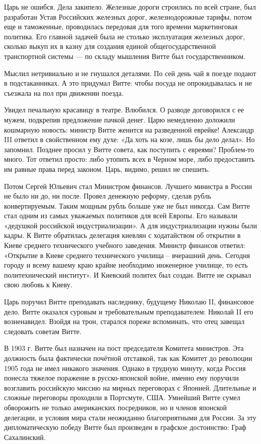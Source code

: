 Царь не ошибся. Дела закипело. Железные дороги строились по всей стране, был
разработан Устав Российских железных дорог, железнодорожные тарифы, потом еще и
таможенные, проводилась передовая для того времени маркетинговая политика. Его
главной задачей была не столько эксплуатация железных дорог, сколько выкуп их в
казну для создания единой общегосударственной транспортной системы — по складу
мышления Витте был государственником.

Мыслил нетривиально и не гнушался деталями. По сей день чай в поезде подают в
подстаканниках. А это придумал Витте: чтобы посуда не опрокидывалась и не
съезжала на пол при движении поезда. 

Увидел печальную красавицу в театре. Влюбился. О разводе договорился с ее
мужем, подкрепив предложение пачкой денег. Царю немедленно доложили кошмарную
новость: министр Витте женится на разведенной еврейке! Александр III ответил в
свойственном ему духе: «Да хоть на козе, лишь бы дело делал». Но запомнил.
Позднее просил у Витте совета, как поступить с евреями? Проблем-то много. Тот
ответил просто: либо утопить всех в Черном море, либо предоставить им равные
права перед законом. Царь, видимо, решил не спешить. 

Потом Сергей Юльевич стал Министром финансов. Лучшего министра в России не было
ни до, ни после. Провел денежную реформу, сделав рубль конвертируемым. Таким
мощным рубль больше уже не был никогда. Сам Витте стал одним из самых уважаемых
политиков для всей Европы. Его называли «дедушкой российской индустриализации».
А для индустриализации нужны были кадры. К Витте обратилась делегация киевлян с
ходатайством об открытии в Киеве среднего технического учебного заведения.
Министр финансов ответил: «Открытие в Киеве среднего технического училища –
вчерашний день. Сегодня городу и всему вашему краю крайне необходимо инженерное
училище, то есть политехнический институт». И Киевский политех был создан.
Витте не скрывал свою любовь к Киеву.

Царь поручил Витте преподавать наследнику, будущему Николаю II, финансовое
дело. Витте оказался суровым и требовательным преподавателем: Николай II его
возненавидел. Взойдя на трон, старался пореже вспоминать, что отец завещал
следовать советам Витте.

В 1903 г. Витте был назначен на пост председателя Комитета министров. Эта
должность была фактически почётной отставкой, так как Комитет до революции 1905
года не имел никакого значения. Однако в трудную минуту, когда Россия понесла
тяжелое поражение в русско-японской войне, именно ему поручили возглавить
российскую миссию на мирных переговорах с Японией. Длительные и сложные
переговоры проходили в Портсмуте, США. Умнейший Витте сумел обворожить не
только американских посредников, но и членов японской делегации, и условия мира
стали неожиданно благоприятными для России. За эту дипломатическую победу Витте
был произведен в графское достоинство: Граф Сахалинский. 

